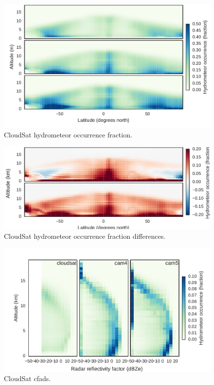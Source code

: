 \begin{figure}[htbp]
\centering
\includegraphics{graphics/cmip5_hfba.pdf}
\caption{\label{fig:cmip5_hfba}CloudSat hydrometeor occurrence
fraction.}\label{fig:cmip5ux5fhfba}
\end{figure}

\begin{figure}[htbp]
\centering
\includegraphics{graphics/cmip5_hfba_diff.pdf}
\caption{\label{fig:cmip5_hfba_diffs}CloudSat hydrometeor occurrence
fraction differences.}\label{fig:cmip5ux5fhfbaux5fdiffs}
\end{figure}

\begin{figure}[htbp]
\centering
\includegraphics{graphics/cmip5_cfadDbze94_NHTropics.pdf}
\caption{\label{fig:cmip5_cfads}CloudSat
cfads.}\label{fig:cmip5ux5fcfads}
\end{figure}

